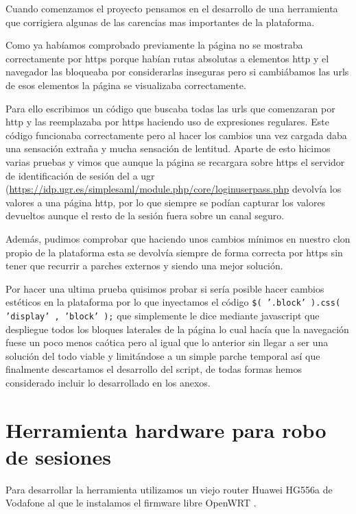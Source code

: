 Cuando comenzamos el proyecto pensamos en el desarrollo de una herramienta que corrigiera algunas de las carencias mas importantes de la plataforma.

\bigskip
Como ya habíamos comprobado previamente la página no se mostraba correctamente por https porque habían rutas absolutas a elementos http y el navegador las bloqueaba por considerarlas inseguras pero si cambiábamos las urls de esos elementos la página se visualizaba correctamente.

\bigskip
Para ello escribimos un código que buscaba todas las urls que comenzaran por http y las reemplazaba por https haciendo uso de expresiones regulares. Este código funcionaba correctamente pero al hacer los cambios una vez cargada daba una sensación extraña y mucha sensación de lentitud. Aparte de esto hicimos varias pruebas y vimos que aunque la página se recargara sobre https el servidor de identificación de sesión del a ugr (\url{https://idp.ugr.es/simplesaml/module.php/core/loginuserpass.php} devolvía los valores a una página http, por lo que siempre se podían capturar los valores devueltos aunque el resto de la sesión fuera sobre un canal seguro.

\bigskip
Además, pudimos comprobar que haciendo unos cambios mínimos en nuestro clon propio de la plataforma esta se devolvía siempre de forma correcta por https sin tener que recurrir a parches externos y siendo una mejor solución.

\bigskip
Por hacer una ultima prueba quisimos probar si sería posible hacer cambios estéticos en la plataforma por lo que inyectamos el código \texttt{\$( '.block' ).css( 'display' , 'block' );} que simplemente le dice mediante javascript que despliegue todos los bloques laterales de la página lo cual hacía que la navegación fuese un poco menos caótica pero al igual que lo anterior sin llegar a ser una solución del todo viable y limitándose a un simple parche temporal así que finalmente descartamos el desarrollo del script, de todas formas hemos considerado incluir lo desarrollado en los anexos.


\section{Herramienta hardware para robo de sesiones}

Para desarrollar la herramienta utilizamos un viejo router Huawei HG556a de Vodafone al que le instalamos el firmware libre OpenWRT \cite{openwrt}.

